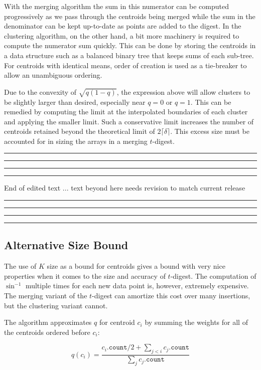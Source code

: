 \documentclass[11pt]{amsart}
\begin{document}
With the merging algorithm the sum in this numerator can be computed progressively as we pass through the centroids being merged while the sum in the denominator can be kept up-to-date as points are added to the digest. In the clustering algorithm, on the other hand, a bit more machinery is required to compute the numerator sum quickly. This can be done by storing the centroids in a data structure such as a balanced binary tree that keeps sums of each sub-tree.  For centroids with identical means, order of creation is used as a tie-breaker to allow an unambiguous ordering.  

Due to the convexity of $\sqrt{q(1-q)}$, the expression above will allow clusters to be slightly larger than desired, especially near $q= 0$ or $q= 1$. This can be remedied by computing the limit at the interpolated boundaries of each cluster and applying the smaller limit. Such a conservative limit increases the number of centroids retained beyond the theoretical limit of $2 \lceil\delta \rceil$. This excess size must be accounted for in sizing the arrays in a merging $t$-digest.

\vspace{10mm}
\hrule
\vspace{0.4mm}
\hrule
\vspace{.6mm}
\hrule
\vspace{1mm}
\hrule
End of edited text ... text beyond here needs revision to match current release
\hrule
\vspace{1mm}
\hrule
\vspace{0.6mm}
\hrule
\vspace{0.4mm}
\hrule
\vspace{10mm}

\subsection{Alternative Size Bound}
The use of $K$ size as a bound for centroids gives a bound with very nice properties when it comes to the size and accuracy of $t$-digest. The computation of $\sin^{-1}$ multiple times for each new data point is, however, extremely expensive. The merging variant of the $t$-digest can amortize this cost over many insertions, but the clustering variant cannot.

The algorithm approximates $q$ for centroid $c_i$ by summing the weights for all of the centroids ordered before $c_i$:

\[q(c_i)=\frac{c_i.\mathtt{count}/2 + \sum_{j<i}c_j.\mathtt{count}} {\sum_j c_j.\mathtt{count}}\]
\end{document}
